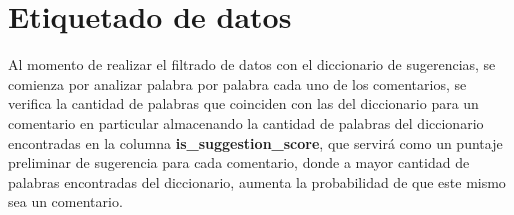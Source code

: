 \section{\textbf{Etiquetado de datos}}
Al momento de realizar el filtrado de datos con el diccionario de sugerencias, se comienza por analizar palabra por palabra cada uno de los comentarios, se verifica la cantidad de palabras que coinciden con las del diccionario para un comentario en particular almacenando la cantidad de palabras del diccionario encontradas en la columna \textbf{is\_suggestion\_score}, que servirá como un puntaje preliminar de sugerencia para cada comentario, donde a mayor cantidad de palabras encontradas del diccionario, aumenta la probabilidad de que este mismo sea un comentario.




